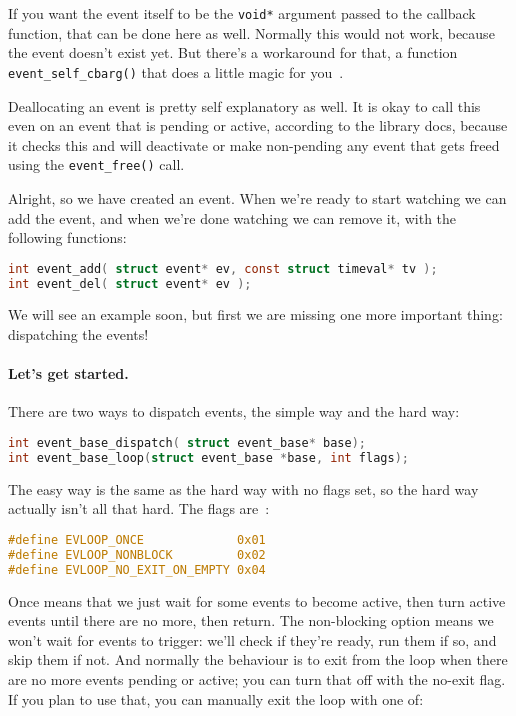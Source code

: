 If you want the event itself to be the \texttt{void*} argument passed to the callback function, that can be done here as well. Normally this would not work, because the event doesn't exist yet. But there's a workaround for that, a function \texttt{event\_self\_cbarg()} that does a little magic for you~\cite{libevent}.

Deallocating an event is pretty self explanatory as well. It is okay to call this even on an event that is pending or active, according to the library docs, because it checks this and will deactivate or make non-pending any event that gets freed using the \texttt{event\_free()} call.

Alright, so we have created an event. When we're ready to start watching we can add the event, and when we're done watching we can remove it, with the following functions:
\begin{lstlisting}[language=C]
int event_add( struct event* ev, const struct timeval* tv );
int event_del( struct event* ev );
\end{lstlisting}

We will see an example soon, but first we are missing one more important thing: dispatching the events!

\paragraph{Let's get started.}
There are two ways to dispatch events, the simple way and the hard way:
\begin{lstlisting}[language=C]
int event_base_dispatch( struct event_base* base);
int event_base_loop(struct event_base *base, int flags);
\end{lstlisting}

The easy way is the same as the hard way with no flags set, so the hard way actually isn't all that hard. The flags are~\cite{libevent}:
\begin{lstlisting}[language=C]
#define EVLOOP_ONCE             0x01
#define EVLOOP_NONBLOCK         0x02
#define EVLOOP_NO_EXIT_ON_EMPTY 0x04
\end{lstlisting}

Once means that we just wait for some events to become active, then turn active events until there are no more, then return. The non-blocking option means we won't wait for events to trigger: we'll check if they're ready, run them if so, and skip them if not. And normally the behaviour is to exit from the loop when there are no more events pending or active; you can turn that off with the no-exit flag. If you plan to use that, you can manually exit the loop with one of:

